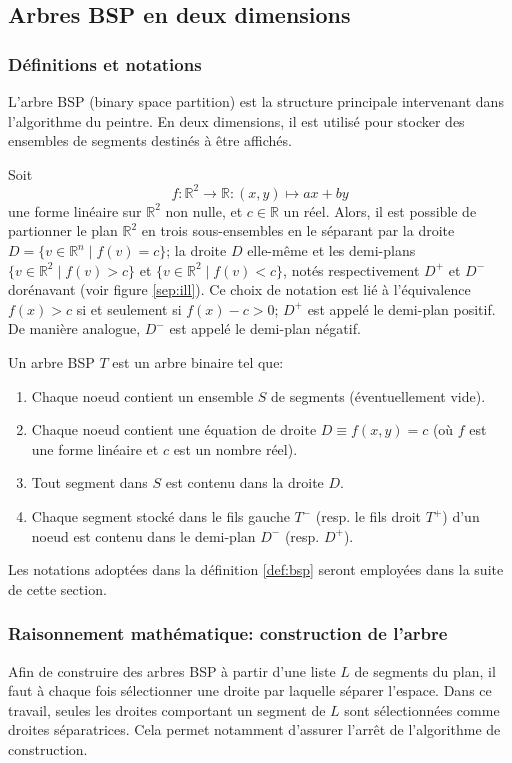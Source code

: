 \subsection{Arbres BSP en deux dimensions}
\subsubsection*{Définitions et notations}
L'arbre BSP (binary space partition) est la structure principale
intervenant dans l'algorithme du peintre. En deux dimensions, il est
utilisé pour stocker des ensembles de segments destinés à être affichés.


Soit
\begin{equation} \label{lin:forme}
f: \mathbb R^2 \to \mathbb R: (x, y)\mapsto ax +by
\end{equation}
une forme linéaire sur $\mathbb R^2$ non nulle, et $c\in\mathbb R$ un réel. Alors, il est possible de
partionner le plan $\mathbb R^2$ en trois sous-ensembles en le séparant
par la droite $D = \{v\in\mathbb R^n\mid f(v) = c\}$;
la droite $D$ elle-même et les demi-plans
$\{v\in\mathbb R^2\mid f(v) > c\}$ et
$\{v\in\mathbb R^2\mid f(v) < c\}$, notés respectivement $D^+$ et $D^-$
dorénavant
(voir figure \ref{sep:ill}). Ce choix de notation est lié à l'équivalence
$f(x)> c$ si et seulement si $f(x)-c>0$; $D^+$ est appelé
le demi-plan positif. De manière analogue, $D^-$ est
appelé le demi-plan négatif.




\begin{df}\label{def:bsp}
  Un arbre BSP $T$ est un arbre binaire tel que:
  \begin{enumerate}
  \item Chaque noeud contient un ensemble $S$ de segments (éventuellement
    vide).
  \item Chaque noeud contient une équation de droite $D\equiv f(x, y) = c$
    (où $f$ est une forme linéaire et $c$ est un nombre réel).
  \item Tout segment dans $S$ est contenu dans la droite $D$.
  \item Chaque segment stocké dans le fils gauche $T^-$ (resp.
    le fils droit $T^+$) d'un noeud est contenu dans le demi-plan
    $D^-$ (resp. $D^+$).
  \end{enumerate}
\end{df}
Les notations adoptées dans la définition \ref{def:bsp} seront employées
dans la suite de cette section.

\subsubsection*{Raisonnement mathématique: construction de l'arbre}
Afin de construire des arbres BSP à partir d'une liste $L$ de segments
du plan, il faut à chaque fois sélectionner une droite par laquelle
séparer l'espace.
Dans ce travail, seules les droites comportant un segment de $L$ sont
sélectionnées comme droites séparatrices. Cela permet notamment d'assurer
l'arrêt de l'algorithme de construction.

